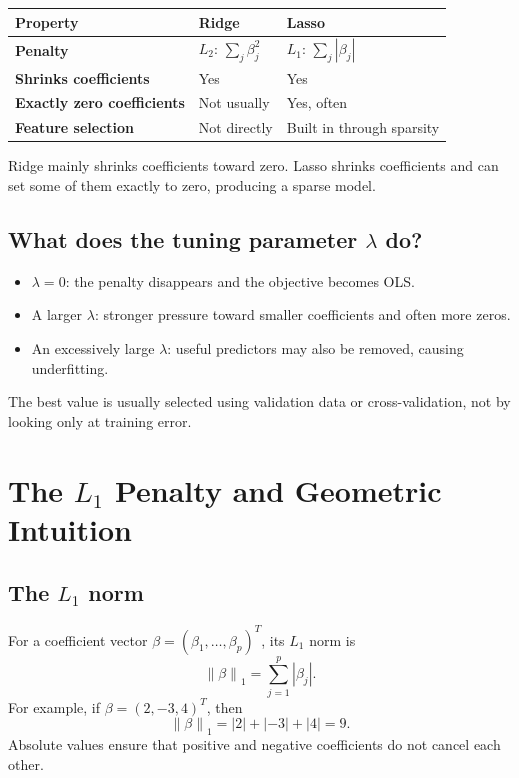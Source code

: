 \documentclass[11pt,a4paper,oneside]{book}
\newcommand{\norm}[1]{\left\lVert #1\right\rVert}
\newcommand{\abs}[1]{\left|#1\right|}
\begin{document}
\begin{center}
\begin{tabularx}{.94\textwidth}{>{\bfseries}lXX}
\toprule
Property & Ridge & Lasso\\
\midrule
Penalty & $L_2$: $\sum_j\beta_j^2$ & $L_1$: $\sum_j\abs{\beta_j}$\\
Shrinks coefficients & Yes & Yes\\
Exactly zero coefficients & Not usually & Yes, often\\
Feature selection & Not directly & Built in through sparsity\\
\bottomrule
\end{tabularx}
\end{center}

\begin{keyidea}
Ridge mainly shrinks coefficients toward zero. Lasso shrinks coefficients and can set some of them exactly to zero, producing a sparse model.
\end{keyidea}

\section{What does the tuning parameter $\lambda$ do?}
\begin{itemize}
  \item $\lambda=0$: the penalty disappears and the objective becomes OLS.
  \item A larger $\lambda$: stronger pressure toward smaller coefficients and often more zeros.
  \item An excessively large $\lambda$: useful predictors may also be removed, causing underfitting.
\end{itemize}
The best value is usually selected using validation data or cross-validation, not by looking only at training error.

\chapter{The $L_1$ Penalty and Geometric Intuition}
\section{The $L_1$ norm}
For a coefficient vector $\beta=(\beta_1,\ldots,\beta_p)^T$, its $L_1$ norm is
\begin{equation}
  \norm{\beta}_1=\sum_{j=1}^p\abs{\beta_j}.
\end{equation}
For example, if $\beta=(2,-3,4)^T$, then
\begin{equation}
  \norm{\beta}_1=\abs{2}+\abs{-3}+\abs{4}=9.
\end{equation}
Absolute values ensure that positive and negative coefficients do not cancel each other.
\end{document}
